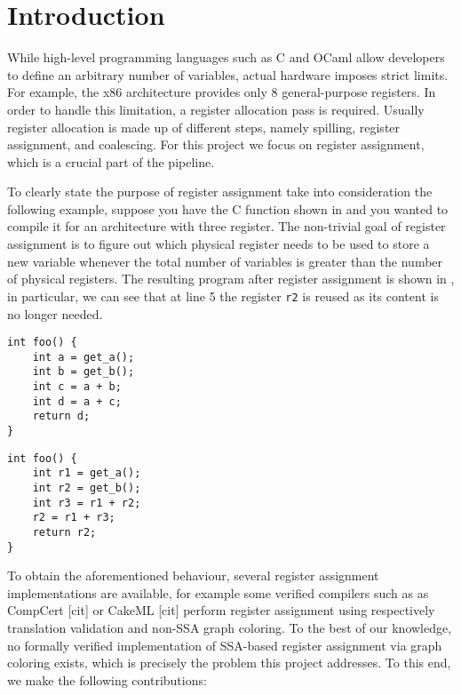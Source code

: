 
\chapter{Introduction}
\label{cha:intro}

While high-level programming languages such as C and OCaml allow developers to define an arbitrary number of variables, actual hardware imposes strict limits. For example, the x86 architecture provides only 8 general-purpose registers.
In order to handle this limitation, a register allocation pass is required. Usually register allocation is made up of different steps, namely spilling, register assignment, and coalescing. For this project we focus on register assignment, which is a crucial part of the pipeline.

To clearly state the purpose of register assignment take into consideration the following example, suppose you have the C function shown in  and you wanted to compile it for an architecture with three register. The non-trivial goal of register assignment is to figure out which physical register needs to be used to store a new variable whenever the total number of variables is greater than the number of physical registers. The resulting program after register assignment is shown in , in particular, we can see that at line 5 the register \texttt{r2} is reused as its content is no longer needed.

\begin{minipage}{0.48\linewidth}
\centering
\lstset{style=C}
\begin{lstlisting}[caption={Original C program.}, label={fig:cbefore}]
int foo() {
    int a = get_a();
    int b = get_b();
    int c = a + b;
    int d = a + c;
    return d;
}
\end{lstlisting}
\end{minipage}
\hfill
\begin{minipage}{0.48\linewidth}
\centering
\lstset{style=C}
\begin{lstlisting}[caption={Same C program after register assignment.}, label={fig:cafter}]
int foo() {
    int r1 = get_a();
    int r2 = get_b();
    int r3 = r1 + r2;
    r2 = r1 + r3;
    return r2;
}
\end{lstlisting}
\end{minipage}

To obtain the aforementioned behaviour, several register assignment implementations are available, for example some verified compilers such as as CompCert [cit] or CakeML [cit] perform register assignment using respectively translation validation and non-SSA graph coloring.
To the best of our knowledge, no formally verified implementation of SSA-based register assignment via graph coloring exists, which is precisely the problem this project addresses. To this end, we make the following contributions:

